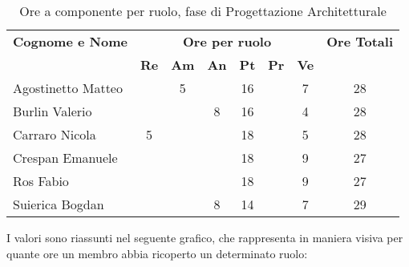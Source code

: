 \begin{table}[h]
	\centering
	\begin{tabular}{|l|c|c|c|c|c|c|c|}
		\toprule
		\textbf{Cognome e Nome} & \multicolumn{6}{c}{\textbf{Ore per ruolo}} & \textbf{Ore Totali} \\
		& \textbf{Re} & \textbf{Am} & \textbf{An} & \textbf{Pt} & \textbf{Pr} & \textbf{Ve} & \\
		
		\midrule
		Agostinetto Matteo & & 5 & & 16 & & 7 & 28 \\
		Burlin Valerio & & & 8 & 16 & & 4 & 28 \\ 
		Carraro Nicola & 5 & & & 18 & & 5 & 28 \\
		Crespan Emanuele & & & & 18 & & 9 & 27 \\
		Ros Fabio & & & & 18 & & 9 & 27 \\
		Suierica Bogdan & & & 8 & 14 & & 7 & 29 \\
		
		\bottomrule
	\end{tabular}
	\caption{Ore a componente per ruolo, fase di Progettazione Architetturale}
\end{table}

\noindent I valori sono riassunti nel seguente grafico, che rappresenta in maniera visiva per quante ore un membro abbia ricoperto un determinato ruolo:

